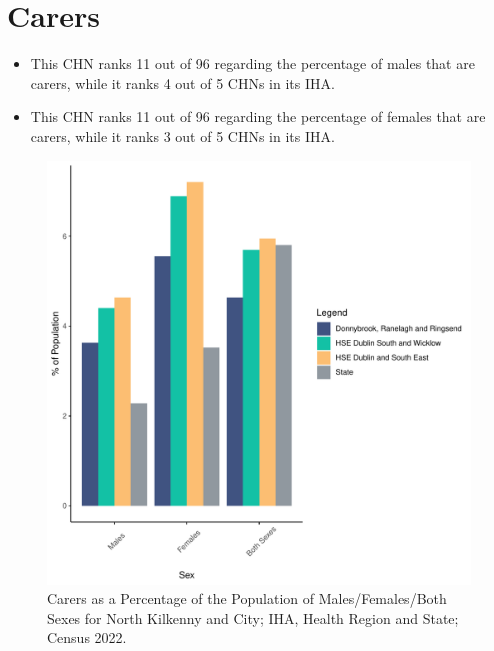 \documentclass{article}
\begin{document}
\section{Carers}\label{sect:Carers}
\begin{itemize}
\item This CHN ranks  11 out of 96 regarding the percentage of males that are carers, while it ranks   4 out of 5 CHNs in its IHA.
\item This CHN ranks  11 out of 96 regarding the percentage of females that are carers, while it ranks   3 out of 5 CHNs in its IHA.
\end{itemize}
\begin{figure}[H]
	\centering
	\includegraphics[width = 150mm]{../figures/CareED.pdf}
	\caption{Carers as a Percentage of the Population of Males/Females/Both Sexes for North Kilkenny and City; IHA, Health Region and State; Census 2022.}
	\label{fig:2ae19629-1a6a-13a3-e055-000000000001}
	\end{figure}
\end{document}
